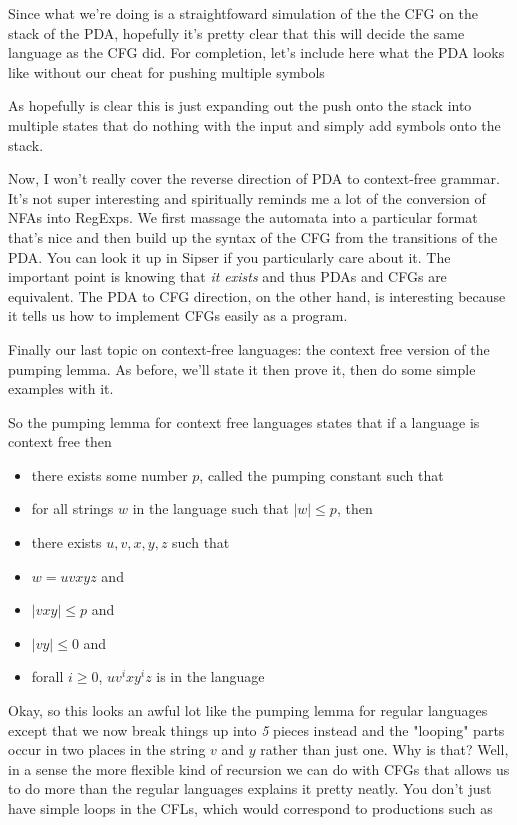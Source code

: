 \documentclass[11pt]{article}
\begin{document}
Since what we're doing is a straightfoward simulation of the the CFG on the stack of the PDA, hopefully it's pretty clear that this will decide the same language as the CFG did. For completion, let's include here what the PDA looks like without our cheat for pushing multiple symbols

As hopefully is clear this is just expanding out the push onto the stack into multiple states that do nothing with the input and simply add symbols onto the stack.

Now, I won't really cover the reverse direction of PDA to context-free grammar. It's not super interesting and spiritually reminds me a lot of the conversion of NFAs into RegExps. We first massage the automata into a particular format that's nice and then build up the syntax of the CFG from the transitions of the PDA. You can look it up in Sipser if you particularly care about it. The important point is knowing that \emph{it exists} and thus PDAs and CFGs are equivalent. The PDA to CFG direction, on the other hand, is interesting because it tells us how to implement CFGs easily as a program.

Finally our last topic on context-free languages: the context free version of the pumping lemma. As before, we'll state it then prove it, then do some simple examples with it.

So the pumping lemma for context free languages states that if a language is context free then
\begin{itemize}
\item there exists some number $p$, called the pumping constant such that
\item for all strings $w$ in the language such that $|w| \le p$, then
\item there exists $u,v,x,y,z$ such that
\item $w = uvxyz$ and
\item $|vxy| \le p$ and
\item $|vy| \le 0$ and
\item forall $i \ge 0$, $uv^ixy^iz$ is in the language
\end{itemize}

Okay, so this looks an awful lot like the pumping lemma for regular languages except that we now break things up into \emph{5} pieces instead and the "looping" parts occur in two places in the string $v$ and $y$ rather than just one. Why is that? Well, in a sense the more flexible kind of recursion we can do with CFGs that allows us to do more than the regular languages explains it pretty neatly. You don't just have simple loops in the CFLs, which would correspond to productions such as 
\end{document}
